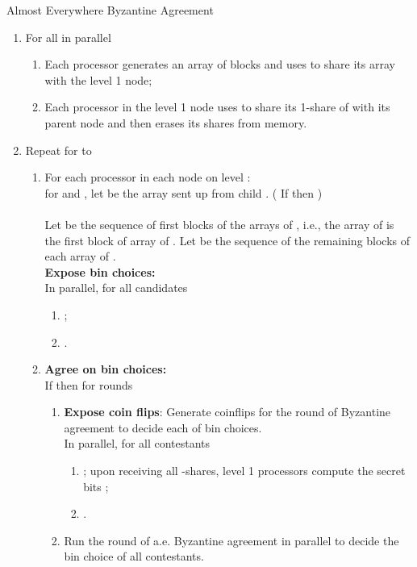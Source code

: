 \documentclass[letterpaper,11pt]{article}
\begin{document}
\begin{algorithm} \label{aeBA}
\caption {Almost Everywhere Byzantine Agreement}
\begin{enumerate}
\item
For all  in parallel
\begin{enumerate}
\item
 Each processor  generates an array of   blocks   and  uses  to share its array with the  level 1 node;
\item
Each processor in the   level 1 node uses   to share its 1-share of  with its parent node
and then erases its shares from memory.  \\
\end{enumerate}
\item
Repeat for  to \\
\begin{enumerate}
\item
For each processor in each node  on level :\\
   for  and , let   be the  array sent up from child . 
( If  then  ) \\
  \\

Let  be the sequence of first blocks of the arrays of , i.e., the  array of  is the first block of  array of .  Let  be the sequence of the remaining blocks  of each array of .\\

 {\bf Expose bin choices:}\\
In parallel,  for all candidates 

 \begin{enumerate}
\item
 ;
  \item
 . \\
\end{enumerate} 

\item {\bf Agree on bin choices:}\\
If  then for rounds   \\
\begin{enumerate}
\item
{\bf Expose coin flips}: Generate  coinflips for the  round of Byzantine agreement to decide each of  bin choices.\\
In parallel,  for all contestants  
\begin{enumerate}
\item
; upon receiving all -shares, level 1 processors compute the secret bits ;
\item
 .
\end{enumerate}
\item
Run the  round of a.e. Byzantine agreement in parallel to decide the bin choice of all contestants. \\
\end{enumerate}


\end{enumerate}
\end{enumerate}
\end{algorithm}
\end{document}
